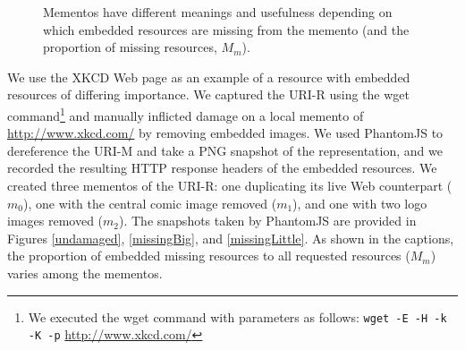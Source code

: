 \begin{figure}[h!t]
\begin{center}
    \qquad
  \end{center}
  \caption{Mementos have different meanings and usefulness depending on which embedded resources are missing from the memento (and the proportion of missing resources, $M_m$).}
  \label{xkcdImgs}
\end{figure}

We use the XKCD Web page as an example of a resource with embedded resources of differing importance. We captured the URI-R using the wget \cite{wget} command\footnote{We executed the wget command with parameters as follows: \texttt{wget -E -H -k -K -p} \url{http://www.xkcd.com/}} and manually inflicted damage on a local memento of \url{http://www.xkcd.com/} by removing embedded images. We used PhantomJS \cite{pjs} to dereference the URI-M and take a PNG snapshot of the representation, and we recorded the resulting HTTP response headers of the embedded resources. We created three mementos of the URI-R: one duplicating its live Web counterpart 
($m_0$), one with the central comic image removed ($m_1$), and one with two logo images removed ($m_2$). The snapshots taken by PhantomJS are provided in Figures \ref{undamaged}, \ref{missingBig}, and \ref{missingLittle}. As shown in the captions, the proportion of embedded missing resources to all requested resources ($M_m$) varies among the mementos.


